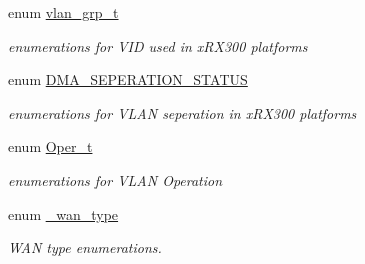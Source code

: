 \begin{DoxyCompactItemize}
enum \hyperlink{group__FAPI__SYSTEM_ga64414502c2a78946b1d58e2c7cf9f36e}{vlan\-\_\-grp\-\_\-t} 
\begin{DoxyCompactList}\small\item\em enumerations for V\-I\-D used in x\-R\-X300 platforms \end{DoxyCompactList}\item 
enum \hyperlink{group__FAPI__SYSTEM_gaefd9ff1d9c8ec164e13a55fed126af70}{D\-M\-A\-\_\-\-S\-E\-P\-E\-R\-A\-T\-I\-O\-N\-\_\-\-S\-T\-A\-T\-U\-S} 
\begin{DoxyCompactList}\small\item\em enumerations for V\-L\-A\-N seperation in x\-R\-X300 platforms \end{DoxyCompactList}\item 
enum \hyperlink{group__FAPI__SYSTEM_gaeda32b17b048a7f04c975abc7e9403c1}{Oper\-\_\-t} 
\begin{DoxyCompactList}\small\item\em enumerations for V\-L\-A\-N Operation \end{DoxyCompactList}\item 
enum \hyperlink{group__FAPI__SYSTEM_ga5ac076a433de0da07d20d9cc9b3623d2}{\-\_\-wan\-\_\-type} 
\begin{DoxyCompactList}\small\item\em W\-A\-N type enumerations. \end{DoxyCompactList}\end{DoxyCompactItemize}
